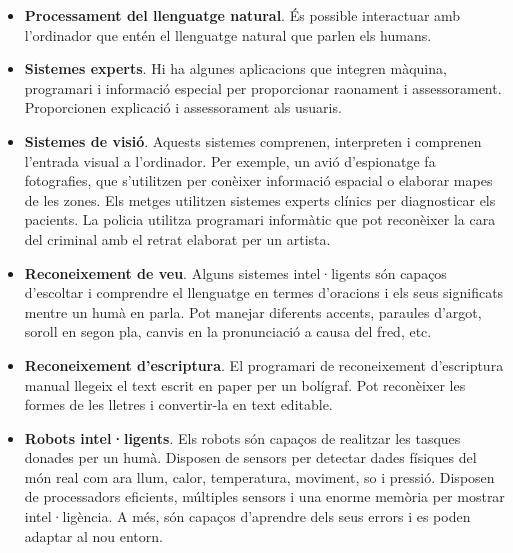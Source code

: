 \begin{refsection}
\begin{itemize}
		\item \textbf{Processament del llenguatge natural}. És possible interactuar amb l’ordinador que entén el llenguatge natural que parlen els humans.
		
		\item \textbf{Sistemes experts}. Hi ha algunes aplicacions que integren màquina, programari i informació especial per proporcionar raonament i assessorament. Proporcionen explicació i assessorament als usuaris.
		
		\item \textbf{Sistemes de visió}. Aquests sistemes comprenen, interpreten i comprenen l’entrada visual a l’ordinador. Per exemple, un avió d'espionatge fa fotografies, que s’utilitzen per conèixer informació espacial o elaborar mapes de les zones. Els metges utilitzen sistemes experts clínics per diagnosticar els pacients. La policia utilitza programari informàtic que pot reconèixer la cara del criminal amb el retrat elaborat per un artista.
		
		\item \textbf{Reconeixement de veu}. Alguns sistemes intel·ligents són capaços d'escoltar i comprendre el llenguatge en termes d'oracions i els seus significats mentre un humà en parla. Pot manejar diferents accents, paraules d'argot, soroll en segon pla, canvis en la pronunciació a causa del fred, etc.
		
		\item \textbf{Reconeixement d’escriptura}. El programari de reconeixement d'escriptura manual llegeix el text escrit en paper per un bolígraf. Pot reconèixer les formes de les lletres i convertir-la en text editable.
		
		\item \textbf{Robots intel·ligents}. Els robots són capaços de realitzar les tasques donades per un humà. Disposen de sensors per detectar dades físiques del món real com ara llum, calor, temperatura, moviment, so i pressió. Disposen de processadors eficients, múltiples sensors i una enorme memòria per mostrar intel·ligència. A més, són capaços d'aprendre dels seus errors i es poden adaptar al nou entorn.
	\end{itemize}
	

	\printbibliography[heading=subbibintoc]

\end{refsection}
